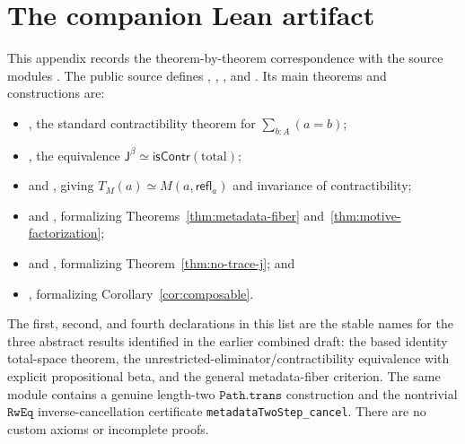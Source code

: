 \documentclass[10pt,reqno]{amsart}
\newcommand{\isContr}{\mathsf{isContr}}
\newcommand{\Eqv}{\simeq}
\newcommand{\Jbeta}{\mathsf J^\beta}
\newcommand{\refl}{\mathsf{refl}}
\begin{document}
\appendix

\section{The companion Lean artifact}
\label{sec:formalization}

This appendix records the theorem-by-theorem correspondence with the source
modules \cite{MetadataJSoftware2026,QuotientPathInductionSoftware2026}.  The
public source
 defines
, ,
, and .  Its main
theorems and constructions are:
\begin{itemize}[leftmargin=1.3em,itemsep=1pt,topsep=3pt]
\item {}, the standard
  contractibility theorem for \(\sum_{b:A}(a=b)\);
\item {}, the equivalence
  \(\Jbeta\Eqv\isContr(\text{total})\);
\item {} and
  , giving
  \(T_M(a)\Eqv M(a,\refl_a)\) and invariance of contractibility;
\item {} and
  , formalizing
  Theorems~\ref{thm:metadata-fiber} and~\ref{thm:motive-factorization};
\item {} and
  , formalizing
  Theorem~\ref{thm:no-trace-j}; and
\item {}, formalizing
  Corollary~\ref{cor:composable}.
\end{itemize}
The first, second, and fourth declarations in this list are the stable names
for the three abstract results identified in the earlier combined draft: the
based identity total-space theorem, the
unrestricted-eliminator/contractibility equivalence with explicit
propositional beta, and the general metadata-fiber criterion.
The same module contains a genuine length-two
\(\texttt{Path.trans}\) construction and the nontrivial
\(\texttt{RwEq}\) inverse-cancellation certificate
\texttt{metadataTwoStep\_cancel}.  There are no custom axioms or incomplete
proofs.
\end{document}
